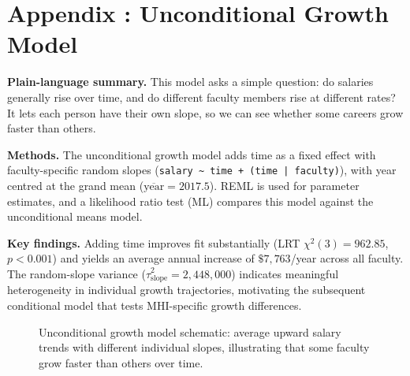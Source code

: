 \documentclass{article}
\begin{document}
\clearpage
{}
\section*{Appendix \thesection: Unconditional Growth Model}
\label{app:unconditional_growth}

\textbf{Plain-language summary.} This model asks a simple question: do salaries generally rise over time, and do different faculty members rise at different rates? It lets each person have their own slope, so we can see whether some careers grow faster than others.

\textbf{Methods.} The unconditional growth model adds time as a fixed effect with faculty-specific random slopes (\texttt{salary \textasciitilde{} time + (time | faculty)}), with year centred at the grand mean (\(\overline{\text{year}}=2017.5\)). REML is used for parameter estimates, and a likelihood ratio test (ML) compares this model against the unconditional means model.

\textbf{Key findings.} Adding time improves fit substantially (LRT \(\chi^2(3) = 962.85\), \(p < 0.001\)) and yields an average annual increase of \(\$7{,}763\)/year across all faculty. The random-slope variance (\(\hat{\tau}^2_{\text{slope}} = 2{,}448{,}000\)) indicates meaningful heterogeneity in individual growth trajectories, motivating the subsequent conditional model that tests MHI-specific growth differences.

\begin{figure}[h]
    \centering
    \caption{Unconditional growth model schematic: average upward salary trends with different individual slopes, illustrating that some faculty grow faster than others over time.}
\end{figure}
\end{document}
